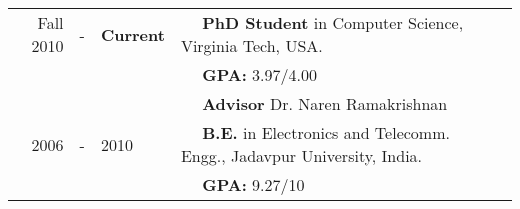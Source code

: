
  \tabcolsep=0.11cm
  \begin{tabular}{rclll}
    Fall 2010 & - &{\bf Current} & $\quad$ {\bf PhD Student} in Computer Science, Virginia Tech, USA. \\
                & & & $\quad$ \textbf{GPA:} 3.97/4.00\\
                & & & $\quad$ \textbf{Advisor} Dr. Naren Ramakrishnan \\
    2006 & - & 2010 & $\quad$ {\bf B.E.} in Electronics and Telecomm. Engg., Jadavpur University, India. \\
        & & & $\quad$ \textbf{GPA:} 9.27/10\\
  \end{tabular}

